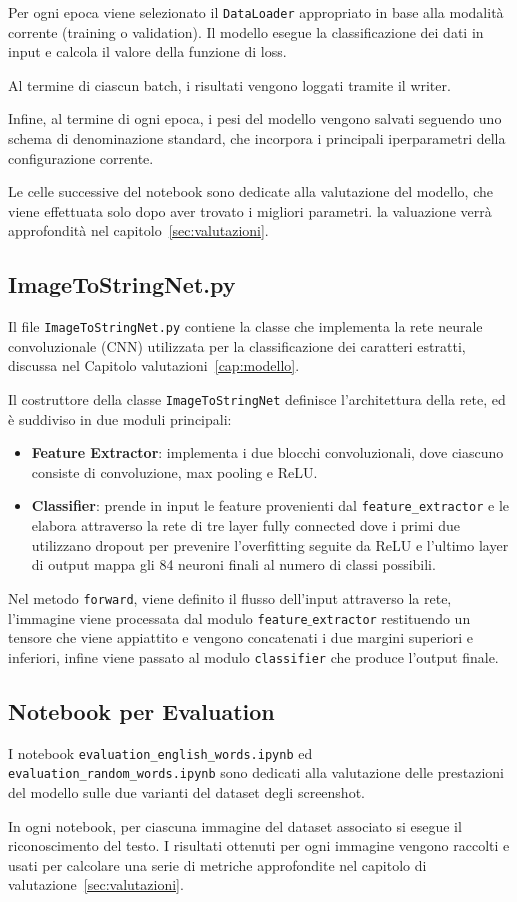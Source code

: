 Per ogni epoca viene selezionato il \texttt{DataLoader} appropriato in base alla modalità corrente (training o validation).  
Il modello esegue la classificazione dei dati in input e calcola il valore della funzione di loss.  

Al termine di ciascun batch, i risultati vengono loggati tramite il writer.

Infine, al termine di ogni epoca, i pesi del modello vengono salvati seguendo uno schema di denominazione standard, che incorpora i principali iperparametri della configurazione corrente.

Le celle successive del notebook sono dedicate alla valutazione del modello, che viene effettuata solo dopo aver trovato i migliori parametri. la valuazione verrà approfondità nel capitolo~\ref{sec:valutazioni}.

\subsection*{ImageToStringNet.py}
Il file \texttt{ImageToStringNet.py} contiene la classe che implementa la rete neurale convoluzionale (CNN) utilizzata per la classificazione dei caratteri estratti, discussa nel Capitolo valutazioni~\ref{cap:modello}. 

Il costruttore della classe \texttt{ImageToStringNet} definisce l'architettura della rete, ed è suddiviso in due moduli principali:
\begin{itemize}
    \item \textbf{Feature Extractor}: implementa i due blocchi convoluzionali, dove ciascuno consiste di convoluzione, max pooling e ReLU.
    \item \textbf{Classifier}: prende in input le feature provenienti dal \texttt{feature\_extractor} e le elabora attraverso la rete di tre layer fully connected dove i primi due utilizzano dropout per prevenire l'overfitting seguite da ReLU e l'ultimo layer di output mappa gli 84 neuroni finali al numero di classi possibili.
\end{itemize}

Nel metodo \texttt{forward}, viene definito il flusso dell'input attraverso la rete, l'immagine viene processata dal modulo \texttt{feature$\_$extractor} restituendo un tensore che viene appiattito e vengono concatenati i due margini superiori e inferiori, infine viene passato al modulo \texttt{classifier} che produce l'output finale.

\subsection*{Notebook per Evaluation}
I notebook \texttt{evaluation\_english\_words.ipynb} ed \\  \texttt{evaluation\_random\_words.ipynb} sono dedicati alla valutazione delle prestazioni del modello sulle due varianti del dataset degli screenshot. 

In ogni notebook, per ciascuna immagine del dataset associato si esegue il riconoscimento del testo. I risultati ottenuti per ogni immagine vengono raccolti e usati per calcolare una serie di metriche approfondite nel capitolo di valutazione~\ref{sec:valutazioni}.